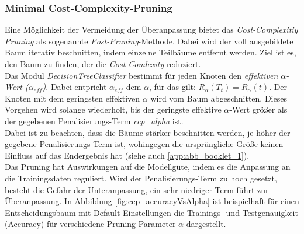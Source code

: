 
\subsubsection{Minimal Cost-Complexity-Pruning}
Eine Möglichkeit der Vermeidung der Überanpassung bietet das \emph{Cost-Complexitiy Pruning} als sogenannte \emph{Post-Pruning}-Methode. Dabei wird der voll ausgebildete Baum iterativ beschnitten, indem einzelne Teilbäume entfernt werden. Ziel ist es, den Baum zu finden, der die \emph{Cost Comlexity} reduziert.\\
\noindent \hspace*{7mm}
Das Modul \emph{DecisionTreeClassifier} bestimmt für jeden Knoten den \emph{effektiven $\alpha$-Wert ($\alpha_{eff}$)}. Dabei entpricht $\alpha_{eff}$ dem $\alpha$, für das gilt: $R_{\alpha}(T_{t})=R_{\alpha}(t)$. Der Knoten mit dem geringsten effektiven $\alpha$ wird vom Baum abgeschnitten. Dieses Vorgehen wird solange wiederholt, bis der geringste effektive $\alpha$-Wert größer als der gegebenen Penalisierungs-Term \emph{ccp\_alpha} ist.\\
\noindent \hspace*{7mm}
Dabei ist zu beachten, dass die Bäume stärker beschnitten werden, je höher der gegebene Penalisierungs-Term ist, wohingegen die ursprüngliche Größe keinen Einfluss auf das Endergebnis hat (siehe auch \ref{app:abb_booklet_1}).\\
\noindent \hspace*{7mm}
Das Pruning hat Auswirkungen auf die Modellgüte, indem es die Anpassung an die Trainingsdaten reguliert. Wird der Penalisierungs-Term zu hoch gesetzt, besteht die Gefahr der Unteranpassung, ein sehr niedriger Term führt zur Überanpassung. In Abbildung \ref{fig:ccp_accuracyVsAlpha} ist beispielhaft für einen Entscheidungsbaum mit Default-Einstellungen die Trainings- und Testgenauigkeit (Accuracy) für verschiedene Pruning-Parameter $\alpha$ dargestellt.

